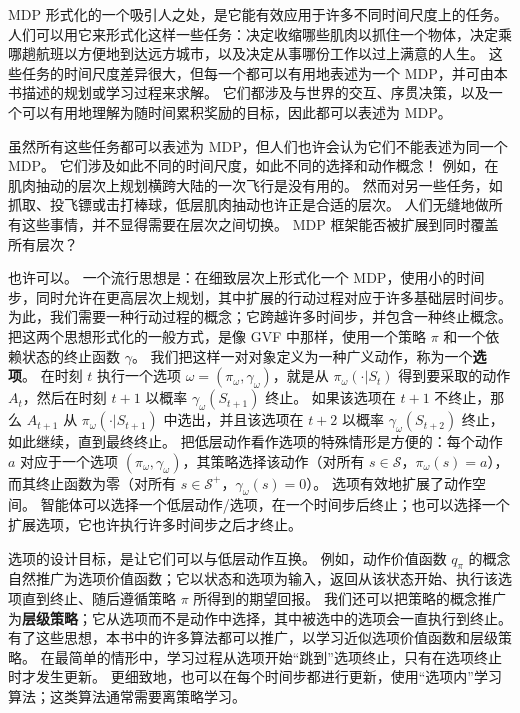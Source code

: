 \documentclass[UTF8,12pt,a4paper,fontset=fandol]{ctexart}
\begin{document}
MDP 形式化的一个吸引人之处，是它能有效应用于许多不同时间尺度上的任务。
人们可以用它来形式化这样一些任务：决定收缩哪些肌肉以抓住一个物体，决定乘哪趟航班以方便地到达远方城市，以及决定从事哪份工作以过上满意的人生。
这些任务的时间尺度差异很大，但每一个都可以有用地表述为一个 MDP，并可由本书描述的规划或学习过程来求解。
它们都涉及与世界的交互、序贯决策，以及一个可以有用地理解为随时间累积奖励的目标，因此都可以表述为 MDP。

虽然所有这些任务都可以表述为 MDP，但人们也许会认为它们不能表述为同一个 MDP。
它们涉及如此不同的时间尺度，如此不同的选择和动作概念！
例如，在肌肉抽动的层次上规划横跨大陆的一次飞行是没有用的。
然而对另一些任务，如抓取、投飞镖或击打棒球，低层肌肉抽动也许正是合适的层次。
人们无缝地做所有这些事情，并不显得需要在层次之间切换。
MDP 框架能否被扩展到同时覆盖所有层次？

也许可以。
一个流行思想是：在细致层次上形式化一个 MDP，使用小的时间步，同时允许在更高层次上规划，其中扩展的行动过程对应于许多基础层时间步。
为此，我们需要一种行动过程的概念；它跨越许多时间步，并包含一种终止概念。
把这两个思想形式化的一般方式，是像 GVF 中那样，使用一个策略 $\pi$ 和一个依赖状态的终止函数 $\gamma$。
我们把这样一对对象定义为一种广义动作，称为一个\textbf{选项}。
在时刻 $t$ 执行一个选项 $\omega=(\pi_\omega,\gamma_\omega)$，就是从 $\pi_\omega(\cdot|S_t)$ 得到要采取的动作 $A_t$，然后在时刻 $t+1$ 以概率 $\gamma_\omega(S_{t+1})$ 终止。
如果该选项在 $t+1$ 不终止，那么 $A_{t+1}$ 从 $\pi_\omega(\cdot|S_{t+1})$ 中选出，并且该选项在 $t+2$ 以概率 $\gamma_\omega(S_{t+2})$ 终止，如此继续，直到最终终止。
把低层动作看作选项的特殊情形是方便的：每个动作 $a$ 对应于一个选项 $(\pi_\omega,\gamma_\omega)$，其策略选择该动作（对所有 $s\in\mathcal{S}$，$\pi_\omega(s)=a$），而其终止函数为零（对所有 $s\in\mathcal{S}^+$，$\gamma_\omega(s)=0$）。
选项有效地扩展了动作空间。
智能体可以选择一个低层动作/选项，在一个时间步后终止；也可以选择一个扩展选项，它也许执行许多时间步之后才终止。

选项的设计目标，是让它们可以与低层动作互换。
例如，动作价值函数 $q_\pi$ 的概念自然推广为选项价值函数；它以状态和选项为输入，返回从该状态开始、执行该选项直到终止、随后遵循策略 $\pi$ 所得到的期望回报。
我们还可以把策略的概念推广为\textbf{层级策略}；它从选项而不是动作中选择，其中被选中的选项会一直执行到终止。
有了这些思想，本书中的许多算法都可以推广，以学习近似选项价值函数和层级策略。
在最简单的情形中，学习过程从选项开始“跳到”选项终止，只有在选项终止时才发生更新。
更细致地，也可以在每个时间步都进行更新，使用“选项内”学习算法；这类算法通常需要离策略学习。
\end{document}
